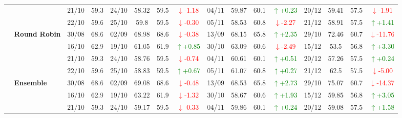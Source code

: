 {\begin{longtable}{llcc|cccc|cccc|cccc}
&
& 21/10 & 59.3 & 24/10 & 58.32 & 59.5 & \textcolor{red}{\(\downarrow\)-1.18} & 04/11 & 59.87 & 60.1 & \textcolor{green}{\(\uparrow\)+0.23} & 20/12 & 59.41 & 57.5 & \textcolor{red}{\(\downarrow\)-1.91} \\

&
& 22/10 & 59.6 & 25/10 & 59.8 & 59.5 & \textcolor{red}{\(\downarrow\)-0.30} & 05/11 & 58.53 & 60.8 & \textcolor{red}{\(\downarrow\)-2.27} & 21/12 & 58.91 & 57.5 & \textcolor{green}{\(\uparrow\)+1.41} \\
\cmidrule(lr){2-16}


& \textbf{Round Robin}
& 30/08 & 68.6 & 02/09 & 68.98 & 68.6 & \textcolor{red}{\(\downarrow\)-0.38} & 13/09 & 68.15 & 65.8 & \textcolor{green}{\(\uparrow\)+2.35} & 29/10 & 72.46 & 60.7 & \textcolor{red}{\(\downarrow\)-11.76} \\

&
& 16/10 & 62.9 & 19/10 & 61.05 & 61.9 & \textcolor{green}{\(\uparrow\)+0.85} & 30/10 & 63.09 & 60.6 & \textcolor{red}{\(\downarrow\)-2.49} & 15/12 & 53.5 & 56.8 & \textcolor{green}{\(\uparrow\)+3.30} \\

&
& 21/10 & 59.3 & 24/10 & 58.76 & 59.5 & \textcolor{red}{\(\downarrow\)-0.74} & 04/11 & 60.61 & 60.1 & \textcolor{green}{\(\uparrow\)+0.51} & 20/12 & 57.26 & 57.5 & \textcolor{green}{\(\uparrow\)+0.24} \\

&
& 22/10 & 59.6 & 25/10 & 58.83 & 59.5 & \textcolor{green}{\(\uparrow\)+0.67} & 05/11 & 61.07 & 60.8 & \textcolor{green}{\(\uparrow\)+0.27} & 21/12 & 62.5 & 57.5 & \textcolor{red}{\(\downarrow\)-5.00} \\
\cmidrule(lr){2-16}

& \textbf{Ensemble}
& 30/08 & 68.6 & 02/09 & 69.08 & 68.6 & \textcolor{red}{\(\downarrow\)-0.48} & 13/09 & 68.53 & 65.8 & \textcolor{green}{\(\uparrow\)+2.73} & 29/10 & 75.07 & 60.7 & \textcolor{red}{\(\downarrow\)-14.37} \\

&
& 16/10 & 62.9 & 19/10 & 63.22 & 61.9 & \textcolor{red}{\(\downarrow\)-1.32} & 30/10 & 58.67 & 60.6 & \textcolor{green}{\(\uparrow\)+1.93} & 15/12 & 59.85 & 56.8 & \textcolor{green}{\(\uparrow\)+3.05} \\

&
& 21/10 & 59.3 & 24/10 & 59.17 & 59.5 & \textcolor{red}{\(\downarrow\)-0.33} & 04/11 & 59.86 & 60.1 & \textcolor{green}{\(\uparrow\)+0.24} & 20/12 & 59.08 & 57.5 & \textcolor{green}{\(\uparrow\)+1.58} \\


\end{longtable}}
